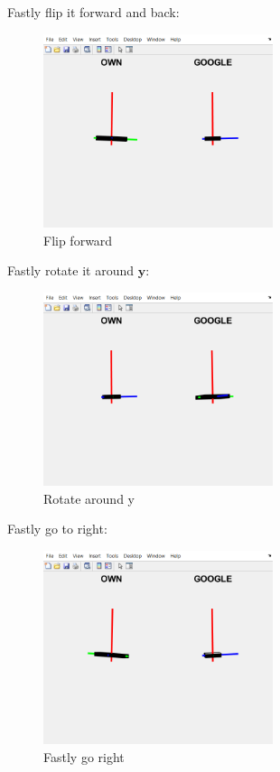 Fastly flip it forward and back:

\begin{figure}[H]
 \centering
 \includegraphics[width=0.6\textwidth]{images/forward.png}
 \caption{Flip forward}
 \label{flipforward}
\end{figure}

Fastly rotate it around $ \mathbf{y} $:

\begin{figure}[H]
 \centering
 \includegraphics[width=0.6\textwidth]{images/rotatey.png}
 \caption{Rotate around y}
 \label{rotatey}
\end{figure}

Fastly go to right:

\begin{figure}[H]
 \centering
 \includegraphics[width=0.6\textwidth]{images/goright.png}
 \caption{Fastly go right}
 \label{fastright}
\end{figure}

